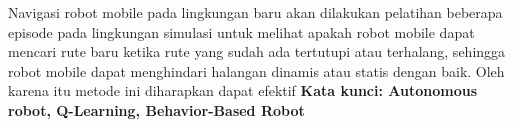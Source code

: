 Navigasi robot mobile pada lingkungan baru akan dilakukan pelatihan beberapa episode pada lingkungan simulasi untuk melihat apakah robot mobile dapat mencari rute baru ketika rute yang sudah ada tertutupi atau terhalang, sehingga robot mobile dapat menghindari halangan dinamis atau statis dengan baik. Oleh karena itu metode ini diharapkan dapat efektif
\textbf{Kata kunci: Autonomous robot, Q-Learning, Behavior-Based Robot} 